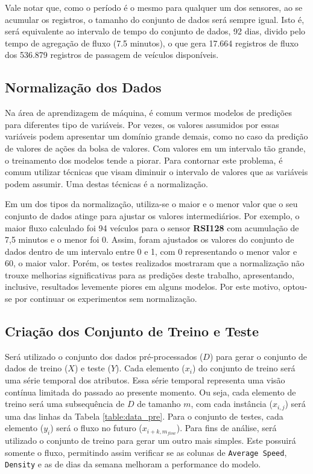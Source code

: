 Vale notar que, como o período é o mesmo para qualquer um dos sensores, ao se acumular os registros, o tamanho do conjunto de dados será sempre igual. Isto é, será equivalente ao intervalo de tempo do conjunto de dados, 92 dias, divido pelo tempo de agregação de fluxo (7.5 minutos), o que gera 17.664 registros de fluxo dos 536.879 registros de passagem de veículos disponíveis.

\subsection{Normalização dos Dados}
Na área de aprendizagem de máquina, é comum vermos modelos de predições para diferentes tipo de variáveis. Por vezes, os valores assumidos por essas variáveis podem apresentar um domínio grande demais, como no caso da predição de valores de ações da bolsa de valores. Com valores em um intervalo tão grande, o treinamento dos modelos tende a piorar. Para contornar este problema, é comum utilizar técnicas que visam diminuir o intervalo de valores que as variáveis podem assumir. Uma destas técnicas é a normalização. 

Em um dos tipos da normalização, utiliza-se o maior e o menor valor que o seu conjunto de dados atinge para ajustar os valores intermediários. Por exemplo, o maior fluxo calculado foi 94 veículos para o sensor \textbf{RSI128} com acumulação de 7,5 minutos e o menor foi 0. Assim, foram ajustados os valores do conjunto de dados dentro de um intervalo entre 0 e 1, com 0 representando o menor valor e 60, o maior valor. Porém, os testes realizados mostraram que a normalização não trouxe melhorias significativas para as predições deste trabalho, apresentando, inclusive, resultados levemente piores em alguns modelos. Por este motivo, optou-se por continuar os experimentos sem normalização.

\subsection{Criação dos Conjunto de Treino e Teste}

Será utilizado o conjunto dos dados pré-processados (\(D\)) para gerar o conjunto de dados de treino (\(X\)) e teste (\(Y\)). Cada elemento (\(x_i\)) do conjunto de treino  será uma série temporal dos atributos. Essa série temporal representa uma visão contínua limitada do passado ao presente momento. Ou seja, cada elemento de treino será uma subsequência de \(D\) de tamanho \(m\), com cada instância (\(x_{i, j}\)) será uma das linhas da Tabela \ref{table:data_pre}. Para o conjunto de testes, cada elemento (\(y_i\)) será o fluxo no futuro (\(x_{i + k, m_{flow}}\)). Para fins de análise, será utilizado o conjunto de treino para gerar um outro mais simples. Este possuirá somente o fluxo, permitindo assim verificar se as colunas de \texttt{Average Speed}, \texttt{Density} e as de dias da semana melhoram a performance do modelo. 

